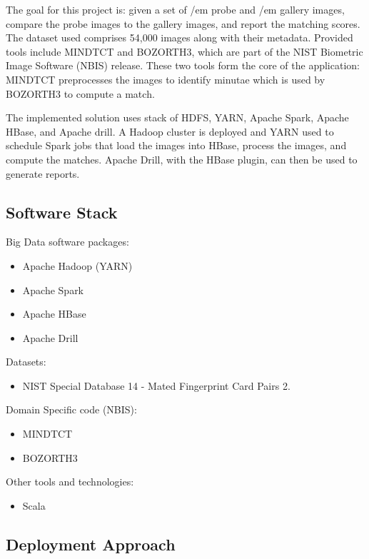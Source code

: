 \documentclass[9pt,twocolumn,twoside]{styles/osajnl}
\begin{document}
The goal for this project is: given a set of {/em probe} and {/em gallery}
images, compare the probe images to the gallery images, and report the
matching scores.  The dataset used comprises 54,000 images along with
their metadata. Provided tools include MINDTCT and BOZORTH3, which are
part of the NIST Biometric Image Software (NBIS) release. These two
tools form the core of the application: MINDTCT preprocesses the
images to identify minutae which is used by BOZORTH3 to compute a
match.



The implemented solution uses stack of HDFS, YARN, Apache Spark, Apache HBase, and Apache drill. A Hadoop cluster is deployed and YARN used to schedule Spark jobs that load the images into HBase, process the images, and compute the matches. Apache Drill, with the HBase plugin, can then be used to generate reports.

\subsection{Software Stack}

Big Data software packages:

\begin{itemize}
\item Apache Hadoop (YARN)
\item Apache Spark
\item Apache HBase
\item Apache Drill
\end{itemize}

Datasets:
\begin{itemize}
\item NIST Special Database 14 - Mated Fingerprint Card Pairs 2.
\end{itemize}

Domain Specific code (NBIS):
\begin{itemize}
\item MINDTCT
\item BOZORTH3
\end{itemize}


Other tools and technologies:
\begin{itemize}
\item Scala
\end{itemize}

\subsection{Deployment Approach}
\end{document}
